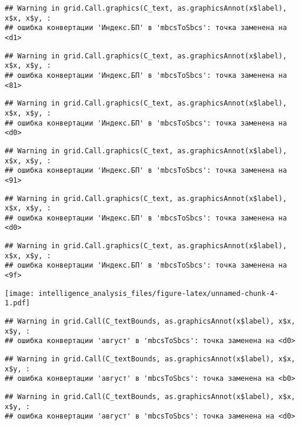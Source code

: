 \documentclass[
]{article}
\begin{document}
\begin{verbatim}
## Warning in grid.Call.graphics(C_text, as.graphicsAnnot(x$label), x$x, x$y, :
## ошибка конвертации 'Индекс.БП' в 'mbcsToSbcs': точка заменена на <d1>
\end{verbatim}

\begin{verbatim}
## Warning in grid.Call.graphics(C_text, as.graphicsAnnot(x$label), x$x, x$y, :
## ошибка конвертации 'Индекс.БП' в 'mbcsToSbcs': точка заменена на <81>
\end{verbatim}

\begin{verbatim}
## Warning in grid.Call.graphics(C_text, as.graphicsAnnot(x$label), x$x, x$y, :
## ошибка конвертации 'Индекс.БП' в 'mbcsToSbcs': точка заменена на <d0>
\end{verbatim}

\begin{verbatim}
## Warning in grid.Call.graphics(C_text, as.graphicsAnnot(x$label), x$x, x$y, :
## ошибка конвертации 'Индекс.БП' в 'mbcsToSbcs': точка заменена на <91>
\end{verbatim}

\begin{verbatim}
## Warning in grid.Call.graphics(C_text, as.graphicsAnnot(x$label), x$x, x$y, :
## ошибка конвертации 'Индекс.БП' в 'mbcsToSbcs': точка заменена на <d0>
\end{verbatim}

\begin{verbatim}
## Warning in grid.Call.graphics(C_text, as.graphicsAnnot(x$label), x$x, x$y, :
## ошибка конвертации 'Индекс.БП' в 'mbcsToSbcs': точка заменена на <9f>
\end{verbatim}

\texttt{[image: intelligence\_analysis\_files/figure-latex/unnamed-chunk-4-1.pdf]}

\begin{verbatim}
## Warning in grid.Call(C_textBounds, as.graphicsAnnot(x$label), x$x, x$y, :
## ошибка конвертации 'август' в 'mbcsToSbcs': точка заменена на <d0>
\end{verbatim}

\begin{verbatim}
## Warning in grid.Call(C_textBounds, as.graphicsAnnot(x$label), x$x, x$y, :
## ошибка конвертации 'август' в 'mbcsToSbcs': точка заменена на <b0>
\end{verbatim}

\begin{verbatim}
## Warning in grid.Call(C_textBounds, as.graphicsAnnot(x$label), x$x, x$y, :
## ошибка конвертации 'август' в 'mbcsToSbcs': точка заменена на <d0>
\end{verbatim}
\end{document}
